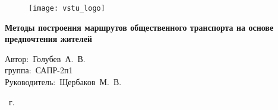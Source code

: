\begin{frame}
    \begin{figure}
        \hspace*{-320pt}\texttt{[image: vstu\_logo]}
    \end{figure}
    \vspace{2em}
    \begin{center}
        \large
        \textbf{Методы построения маршрутов общественного транспорта на основе предпочтения жителей}\\
    \end{center}
    \vspace{2em}
    \begin{flushleft}
        \hspace{12em}Автор:~Голубев~А.~В.\\
        \hspace{12em}группа:~САПР-2п1\\
        \hspace{12em}Руководитель:~Щербаков~М.~В.
    \end{flushleft}
    \vspace{3em}
     \the\year\ г.
\end{frame}



